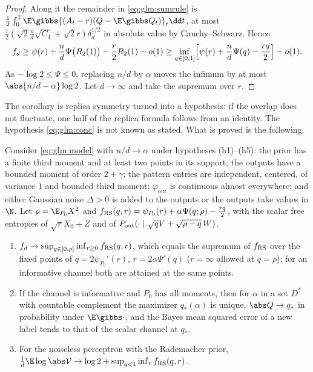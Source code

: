 \begin{refsection}
\begin{proof}
Along it the remainder in \eqref{eq:glm:sumrule} is $\frac12\int_0^1\E\gibbs{(A_t-r)(Q-\E\gibbs Q_t)}_t\dd t$, at most $\frac12(\sqrt2\frac nd\sqrt{C_4}+\sqrt2r)\delta_d^{1/2}$ in absolute value by Cauchy--Schwarz. Hence
\[
f_d\ge\psi(r)+\frac nd\Psi\bigl(R_2(1)\bigr)-\frac r2R_2(1)-o(1)\ge\inf_{q\in[0,1]}\Bigl[\psi(r)+\frac nd\Psi(q)-\frac{rq}2\Bigr]-o(1).
\]
As $-\log2\le\Psi\le0$, replacing $n/d$ by $\alpha$ moves the infimum by at most $\abs{n/d-\alpha}\log2$. Let $d\to\infty$ and take the supremum over $r$.
\end{proof}

The corollary is replica symmetry turned into a hypothesis: if the overlap does not fluctuate, one half of the replica formula follows from an identity. The hypothesis \eqref{eq:glm:conc} is not known as stated. What is proved is the following.

\begin{theorem}\label{thm:glm:rsformula}
Consider \eqref{eq:glm:model} with $n/d\to\alpha$ under hypotheses (h1)--(h5): the prior has a finite third moment and at least two points in its support; the outputs have a bounded moment of order $2+\gamma$; the pattern entries are independent, centered, of variance $1$ and bounded third moment; $\varphi_{\mathrm{out}}$ is continuous almost everywhere; and either Gaussian noise $\Delta>0$ is added to the outputs or the outputs take values in $\N$. Let $\rho=\E_{P_0}X^2$ and $f_{\mathrm{RS}}(q,r)=\psi_{P_0}(r)+\alpha\Psi(q;\rho)-\frac{rq}2$, with the scalar free entropies of $\sqrt rX_0+Z$ and of $P_{\mathrm{out}}(\cdot\mid\sqrt qV+\sqrt{\rho-q}\,W)$.
\begin{enumerate}
\item $f_d\to\sup_{q\in[0,\rho]}\inf_{r\ge0}f_{\mathrm{RS}}(q,r)$, which equals the supremum of $f_{\mathrm{RS}}$ over the fixed points of $q=2\psi_{P_0}'(r)$, $r=2\alpha\Psi'(q)$ ($r=\infty$ allowed at $q=\rho$); for an informative channel both are attained at the same points.
\item If the channel is informative and $P_0$ has all moments, then for $\alpha$ in a set $D^*$ with countable complement the maximizer $q_*(\alpha)$ is unique, $\abs Q\to q_*$ in probability under $\E\gibbs\cdot$, and the Bayes mean squared error of a new label tends to that of the scalar channel at $q_*$.
\item For the noiseless perceptron with the Rademacher prior, $\frac1d\E\log\abs\glmV\to\log2+\sup_{q<1}\inf_r\glmfrs(q,r)$.
\end{enumerate}
\end{theorem}


\end{refsection}
